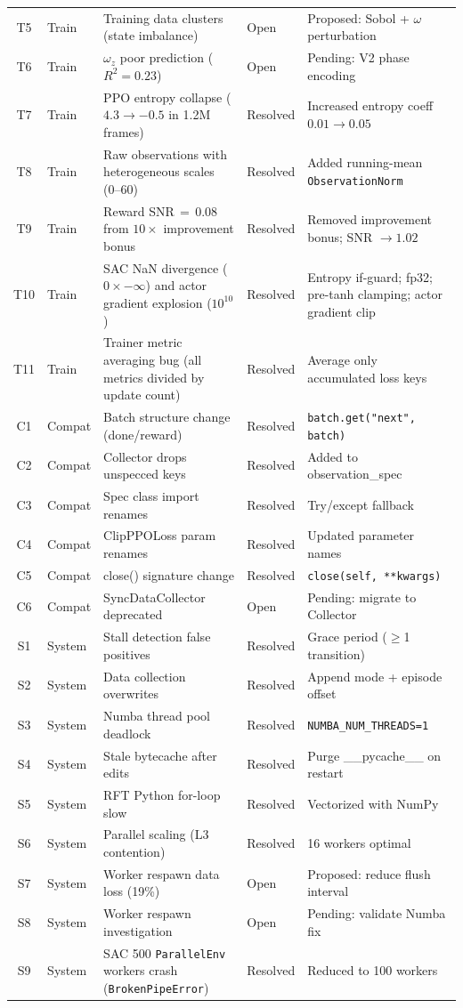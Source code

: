 \documentclass[11pt]{article}
\begin{document}
\begin{longtable}{@{}clp{4.5cm}lp{5.0cm}@{}}
T5 & Train & Training data clusters (state imbalance) & Open & Proposed: Sobol + $\omega$ perturbation \\
T6 & Train & $\omega_z$ poor prediction ($R^2{=}0.23$) & Open & Pending: V2 phase encoding \\
T7 & Train & PPO entropy collapse ($4.3 \to -0.5$ in 1.2M frames) & Resolved & Increased entropy coeff $0.01 \to 0.05$ \\
T8 & Train & Raw observations with heterogeneous scales (0--60) & Resolved & Added running-mean \texttt{ObservationNorm} \\
T9 & Train & Reward SNR\,$=$\,0.08 from $10{\times}$ improvement bonus & Resolved & Removed improvement bonus; SNR $\to 1.02$ \\
T10 & Train & SAC NaN divergence ($0 \times {-\infty}$) and actor gradient explosion ($10^{10}$) & Resolved & Entropy if-guard; fp32; pre-tanh clamping; actor gradient clip \\
T11 & Train & Trainer metric averaging bug (all metrics divided by update count) & Resolved & Average only accumulated loss keys \\
\addlinespace
C1 & Compat & Batch structure change (done/reward) & Resolved & \texttt{batch.get("next", batch)} \\
C2 & Compat & Collector drops unspecced keys & Resolved & Added to observation\_spec \\
C3 & Compat & Spec class import renames & Resolved & Try/except fallback \\
C4 & Compat & ClipPPOLoss param renames & Resolved & Updated parameter names \\
C5 & Compat & close() signature change & Resolved & \texttt{close(self, **kwargs)} \\
C6 & Compat & SyncDataCollector deprecated & Open & Pending: migrate to Collector \\
\addlinespace
S1 & System & Stall detection false positives & Resolved & Grace period ($\geq$1 transition) \\
S2 & System & Data collection overwrites & Resolved & Append mode + episode offset \\
S3 & System & Numba thread pool deadlock & Resolved & \texttt{NUMBA\_NUM\_THREADS=1} \\
S4 & System & Stale bytecache after edits & Resolved & Purge \_\_pycache\_\_ on restart \\
S5 & System & RFT Python for-loop slow & Resolved & Vectorized with NumPy \\
S6 & System & Parallel scaling (L3 contention) & Resolved & 16 workers optimal \\
S7 & System & Worker respawn data loss (19\%) & Open & Proposed: reduce flush interval \\
S8 & System & Worker respawn investigation & Open & Pending: validate Numba fix \\
S9 & System & SAC 500 \texttt{ParallelEnv} workers crash (\texttt{BrokenPipeError}) & Resolved & Reduced to 100 workers \\
\end{longtable}
\end{document}
